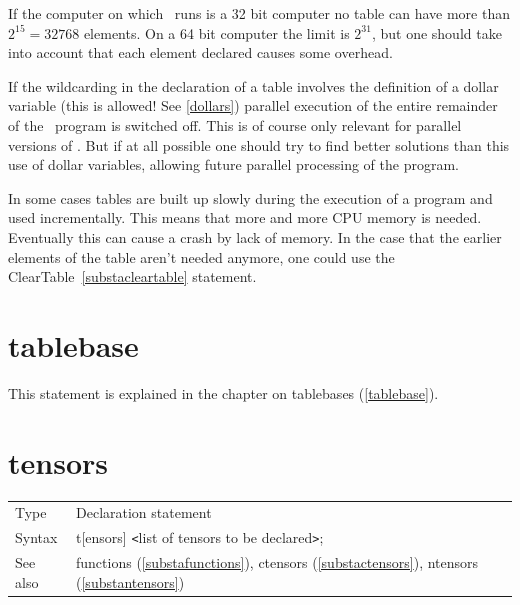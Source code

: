 \noindent If the computer on which \FORM\ runs is a 32 bit 
computer no table can have more than $2^{15} = 32768$ elements. On a 
64 bit computer the limit is $2^{31}$, but one should take 
into account that each element declared causes some overhead. \vspace{4mm}

\noindent If the wildcarding in the declaration of a table involves the 
definition of a dollar variable (this is allowed! See 
\ref{dollars}) parallel execution of the entire remainder of the \FORM\ 
program is switched off. This is of course only relevant for parallel 
versions of \FORM\@. But if at all possible one should try to find better 
solutions than this use of dollar variables, allowing future parallel 
processing of the program.

\noindent In some cases tables are built up slowly during the execution of 
a program and used incrementally. This means that more and more CPU memory 
is needed. Eventually this can cause a crash by lack of memory. In the case 
that the earlier elements of the table aren't needed anymore, one could use 
the ClearTable~\ref{substacleartable} statement.
\vspace{10mm}


\section{tablebase}
\label{substatablebase}

\noindent This statement is explained in the chapter on 
tablebases (\ref{tablebase}).
\vspace{10mm}

 
\section{tensors}
\label{substatensors}

\noindent \begin{tabular}{ll}
Type & Declaration statement\\
Syntax & t[ensors] {\tt<}list of tensors to be declared{\tt>}; \\
See also & functions (\ref{substafunctions}), ctensors 
        (\ref{substactensors}), ntensors (\ref{substantensors})
\end{tabular}\vspace{4mm}

